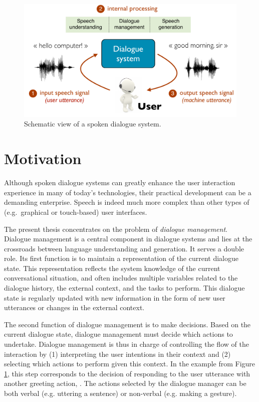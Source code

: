 \begin{figure}[ht]
\center
\includegraphics[scale=0.46]{imgs/basicsds.pdf}
\caption{Schematic view of a spoken dialogue system.}
\label{fig:basicsds}
\end{figure}

\section{Motivation}

Although spoken dialogue systems can greatly enhance the user interaction experience in many of today's technologies, their practical development can be a demanding enterprise. Speech is indeed much more complex than other types of (e.g.\ graphical or touch-based) user interfaces.

The present thesis concentrates on the problem of \textit{dialogue management}.  Dialogue management is a central component in dialogue systems and lies at the crossroads between language understanding and generation.  It serves a double role. Its first function is to maintain a representation of the current dialogue state. This representation reflects the system knowledge of the current conversational situation, and often includes multiple variables related to the dialogue history, the external context, and the tasks to perform.  This dialogue state is regularly updated with new information in the form of new user utterances or changes in the external context. 

The second function of dialogue management is to make decisions.  Based on the current dialogue state, dialogue management must decide which actions to undertake.  Dialogue management is thus in charge of controlling the flow of the interaction by (1) interpreting the user intentions in their context and (2) selecting which actions to perform given this context. In the example from Figure \ref{fig:basicsds}, this step corresponds to the decision of responding to the user utterance  with another greeting action, .  The actions selected by the dialogue manager can be both verbal (e.g. uttering a sentence) or non-verbal (e.g. making a gesture). 

